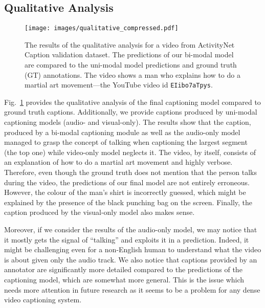 \documentclass{src/bmvc2k}
\begin{document}
\subsection{Qualitative Analysis \label{sec:qualitative_analysis}}

\begin{figure}[h]
\begin{center}
\texttt{[image: images/qualitative\_compressed.pdf]}
\end{center}
\caption{The results of the qualitative analysis for a video from ActivityNet Caption validation dataset. The predictions of our bi-modal model are compared to the uni-modal model predictions and ground truth (GT) annotations. The video shows a man who explains how to do a martial art movement---the YouTube video id \texttt{EIibo7aTpys}. \label{fig:qualitative_analysis}}
\end{figure}

Fig.~\ref{fig:qualitative_analysis} provides the qualitative analysis of the final captioning model compared to ground truth captions. Additionally, we provide captions produced by uni-modal captioning models (audio- and visual-only). The results show that the caption, produced by a bi-modal captioning module as well as the audio-only model managed to grasp the concept of talking when captioning the largest segment (the top one) while video-only model neglects it. The video, by itself, consists of an explanation of how to do a martial art movement and highly verbose. Therefore, even though the ground truth does not mention that the person talks during the video, the predictions of our final model are not entirely erroneous. However, the colour of the man's shirt is incorrectly guessed, which might be explained by the presence of the black punching bag on the screen. Finally, the caption produced by the visual-only model also makes sense.

Moreover, if we consider the results of the audio-only model, we may notice that it mostly gets the signal of ``talking'' and exploits it in a prediction. Indeed, it might be challenging even for a non-English human to understand what the video is about given only the audio track. We also notice that captions provided by an annotator are significantly more detailed compared to the predictions of the captioning model, which are somewhat more general. This is the issue which needs more attention in future research as it seems to be a problem for any dense video captioning system.
\end{document}
